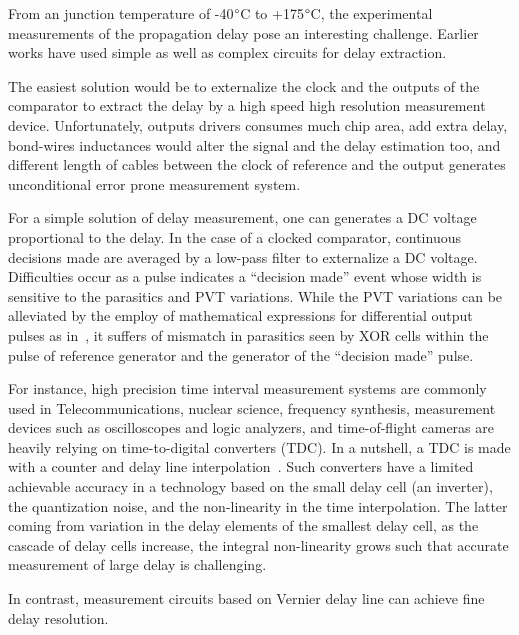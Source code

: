 From an junction temperature of -40\(\degree \)C to +175\(\degree \)C, the experimental measurements of the propagation delay pose an interesting challenge. Earlier works have used simple as well as complex circuits for delay extraction. 

The easiest solution would be to externalize the clock and the outputs of the comparator to extract the delay by a high speed high resolution measurement device. Unfortunately, outputs drivers consumes much chip area, add extra delay, bond-wires inductances would alter the signal and the delay estimation too, and different length of cables between the clock of reference and the output generates unconditional error prone measurement system.

For a simple solution of delay measurement, one can generates a DC voltage proportional to the delay. In the case of a clocked comparator, continuous decisions made are averaged by a low-pass filter to externalize a DC voltage. Difficulties occur as a pulse indicates a ``decision made'' event whose width is sensitive to the parasitics and PVT variations. While the PVT variations can be alleviated by the employ of mathematical expressions for differential output pulses as in~\cite{1706643}, it suffers of mismatch in parasitics seen by XOR cells within the pulse of reference generator and the generator of the ``decision made'' pulse.

For instance, high precision time interval measurement systems are commonly used in Telecommunications, nuclear science, frequency synthesis, measurement devices such as oscilloscopes and logic analyzers, and time-of-flight cameras are heavily relying on time-to-digital converters (TDC). In a nutshell, a TDC is made with a counter and delay line interpolation~\cite{1637593}. Such converters have a limited achievable accuracy in a technology based on the small delay cell (an inverter), the quantization noise, and the non-linearity in the time interpolation. The latter coming from variation in the delay elements of the smallest delay cell, as the cascade of delay cells increase, the integral non-linearity grows such that accurate measurement of large delay is challenging.

In contrast, measurement circuits based on Vernier delay line can achieve fine delay resolution.

